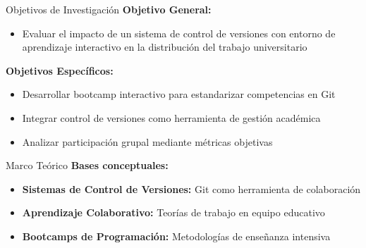 \documentclass[t]{beamer}
\begin{document}
\begin{frame}{Objetivos de Investigación}
    \textbf{Objetivo General:}
    \begin{itemize}
        \item Evaluar el impacto de un sistema de control de versiones con entorno de aprendizaje interactivo en la distribución del trabajo universitario
    \end{itemize}
    
    \vspace{0.4cm}
    
    \textbf{Objetivos Específicos:}
    \begin{itemize}
        \item Desarrollar bootcamp interactivo para estandarizar competencias en Git
        \item Integrar control de versiones como herramienta de gestión académica
        \item Analizar participación grupal mediante métricas objetivas
    \end{itemize}
\end{frame}

\begin{frame}{Marco Teórico}
    \textbf{Bases conceptuales:}
    \begin{itemize}
        \item \textbf{Sistemas de Control de Versiones:} Git como herramienta de colaboración
        
        \vspace{0.3cm}
        
        \item \textbf{Aprendizaje Colaborativo:} Teorías de trabajo en equipo educativo
        
        \vspace{0.3cm}
        
        \item \textbf{Bootcamps de Programación:} Metodologías de enseñanza intensiva
    \end{itemize}
\end{frame}
\end{document}
